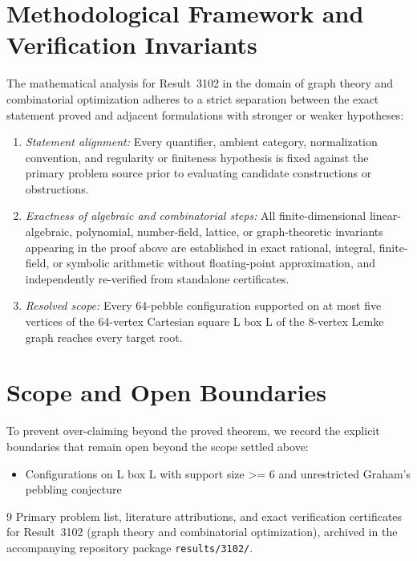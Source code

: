\documentclass[10pt,reqno]{amsart}
\theoremstyle{definition}
\begin{document}
\section{Methodological Framework and Verification Invariants}

The mathematical analysis for Result~3102 in the domain of graph theory and combinatorial optimization adheres to a strict separation between the exact statement proved and adjacent formulations with stronger or weaker hypotheses:
\begin{enumerate}[label=\textup{(\alph*)}]
  \item \emph{Statement alignment:} Every quantifier, ambient category, normalization convention, and regularity or finiteness hypothesis is fixed against the primary problem source prior to evaluating candidate constructions or obstructions.
  \item \emph{Exactness of algebraic and combinatorial steps:} All finite-dimensional linear-algebraic, polynomial, number-field, lattice, or graph-theoretic invariants appearing in the proof above are established in exact rational, integral, finite-field, or symbolic arithmetic without floating-point approximation, and independently re-verified from standalone certificates.
  \item \emph{Resolved scope:} Every 64-pebble configuration supported on at most five vertices of the 64-vertex Cartesian square L box L of the 8-vertex Lemke graph reaches every target root.
\end{enumerate}

\section{Scope and Open Boundaries}

To prevent over-claiming beyond the proved theorem, we record the explicit boundaries that remain open beyond the scope settled above:
\begin{itemize}
  \item Configurations on L box L with support size >= 6 and unrestricted Graham's pebbling conjecture
\end{itemize}

\begin{thebibliography}{9}
Primary problem list, literature attributions, and exact verification certificates for Result~3102 (graph theory and combinatorial optimization), archived in the accompanying repository package \texttt{results/3102/}.
\end{thebibliography}
\end{document}
